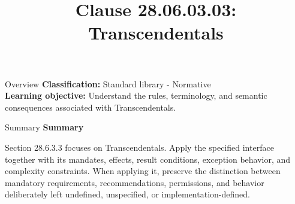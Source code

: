 \documentclass[10pt,letterpaper]{article}
\title{Clause 28.06.03.03: Transcendentals}
\author{}
\date{}
\begin{document}
\maketitle
\begin{CornellOverviewBox}{Overview}
\textbf{Classification:} Standard library - Normative\\[2pt]
\textbf{Learning objective:} Understand the rules, terminology, and semantic consequences associated with Transcendentals.
\end{CornellOverviewBox}\begin{CornellSummaryBox}{Summary}
{\sffamily\bfseries\color{Accent} Summary}\par\vspace{3pt}Section 28.6.3.3 focuses on Transcendentals. Apply the specified interface together with its mandates, effects, result conditions, exception behavior, and complexity constraints. When applying it, preserve the distinction between mandatory requirements, recommendations, permissions, and behavior deliberately left undefined, unspecified, or implementation-defined.
\end{CornellSummaryBox}
\end{document}

